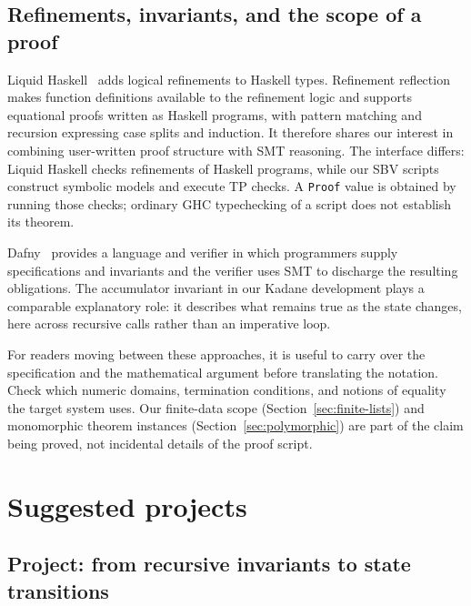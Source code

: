 \documentclass[review]{jfp-epi}
\newcommand{\code}[1]{\texttt{#1}}
\begin{document}
\subsection{Refinements, invariants, and the scope of a proof}

Liquid Haskell~\citep{liquidhaskell} adds logical refinements to Haskell types.
Refinement reflection~\citep{reflection} makes function definitions available
to the refinement logic and supports equational proofs written as Haskell
programs, with pattern matching and recursion expressing case splits and
induction. It therefore shares our interest in combining user-written proof
structure with SMT reasoning. The interface differs: Liquid Haskell checks
refinements of Haskell programs, while our SBV scripts construct symbolic
models and execute TP checks. A \code{Proof} value is obtained by running those
checks; ordinary GHC typechecking of a script does not establish its theorem.

Dafny~\citep{dafny} provides a language and verifier in which programmers supply
specifications and invariants and the verifier uses SMT to discharge the
resulting obligations. The accumulator invariant in our Kadane development
plays a comparable explanatory role: it describes what remains true as the
state changes, here across recursive calls rather than an imperative loop.

For readers moving between these approaches, it is useful to carry over the
specification and the mathematical argument before translating the notation.
Check which numeric domains, termination conditions, and notions of equality
the target system uses. Our finite-data scope (Section~\ref{sec:finite-lists})
and monomorphic theorem instances (Section~\ref{sec:polymorphic}) are part of the
claim being proved, not incidental details of the proof script.

\section{Suggested projects}
\label{sec:projects}

\subsection{Project: from recursive invariants to state transitions}
\label{sec:stateful-programs}
\end{document}
